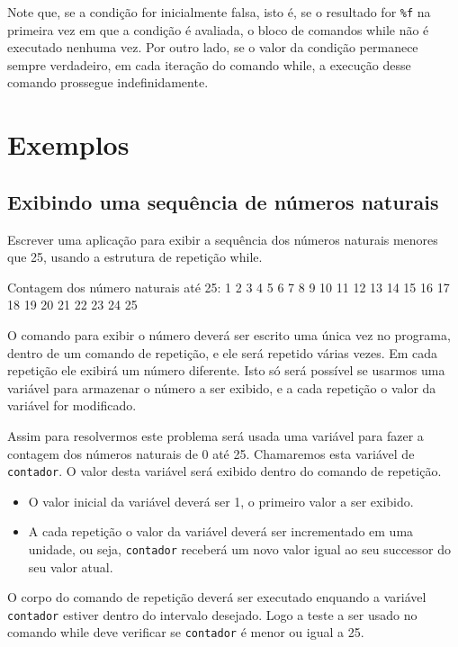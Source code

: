 \documentclass[11pt,fleqn]{practice}
\begin{document}
Note que, se a condição for inicialmente falsa, isto é, se o resultado 
for \texttt{\%f} na primeira vez em que a condição é avaliada, o bloco 
de comandos while não é executado nenhuma vez. Por outro lado, se o
valor da condição permanece sempre verdadeiro, em cada iteração do
comando while, a execução desse comando prossegue indefinidamente.

\section{Exemplos}

\subsection{Exibindo uma sequência de números naturais}

Escrever uma aplicação para exibir a sequência dos números naturais
menores que 25, usando a estrutura de repetição while.

\begin{runexample}
Contagem dos número naturais até 25:
1 2 3 4 5 6 7 8 9 10 11 12 13 14 15 16 17 18 19 20 21 22 23 24 25
\end{runexample}

O comando para exibir o número deverá ser escrito uma única vez no
programa, dentro de um comando de repetição, e ele será repetido várias
vezes. Em cada repetição ele exibirá um número diferente. Isto só será
possível se usarmos uma variável para armazenar o número a ser exibido,
e a cada repetição o valor da variável for modificado.

Assim para resolvermos este problema será usada uma variável para fazer
a contagem dos números naturais de 0 até 25. Chamaremos esta variável de
\texttt{contador}. O valor desta variável será exibido dentro do comando
de repetição.
\begin{itemize}
  \item O valor inicial da variável deverá ser 1, o primeiro valor a ser
  exibido.
  \item A cada repetição o valor da variável deverá ser incrementado em
  uma unidade, ou seja, \texttt{contador} receberá um novo valor igual
  ao seu successor do seu valor atual.
\end{itemize}
O corpo do comando de repetição deverá ser executado enquando a variável
\texttt{contador} estiver dentro do intervalo desejado. Logo a teste a
ser usado no comando while deve verificar se \texttt{contador} é menor
ou igual a 25.
\end{document}

